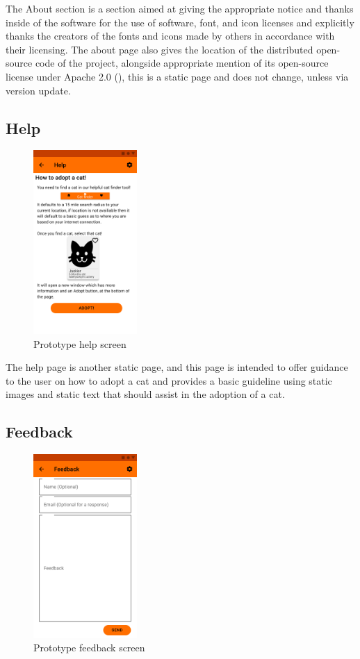 The About section is a section aimed at giving the appropriate notice and thanks inside of the software for the use of software, font, and icon licenses and explicitly thanks the creators of the fonts and icons made by others in accordance with their licensing. The about page also gives the location of the distributed open-source code of the project, alongside appropriate mention of its open-source license under Apache 2.0 (\cite{APACHE2LICENSE}), this is a static page and does not change, unless via version update.

\subsection{Help}

\begin{figure} [htbp!]
    \centering
    \includegraphics[height=7cm]{Images/PrototypeHelp.png}
    \caption{Prototype help screen}
    \label{fig:prototype_help_screen}
\end{figure}

The help page is another static page, and this page is intended to offer guidance to the user on how to adopt a cat and provides a basic guideline using static images and static text that should assist in the adoption of a cat.

\subsection{Feedback}

\begin{figure} [htbp!]
    \centering
    \includegraphics[height=7cm]{Images/PrototypeFeedback.png}
    \caption{Prototype feedback screen}
    \label{fig:prototype_feedback_screen}
\end{figure}

